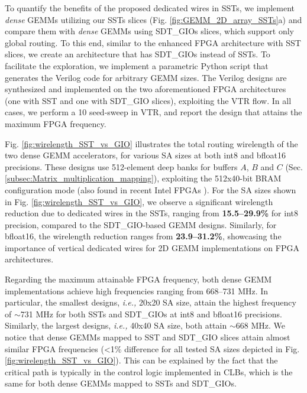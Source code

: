 To quantify the benefits of the proposed dedicated wires in SSTs, we implement \textit{dense} GEMMs utilizing our SSTs slices (Fig. \ref{fig:GEMM_2D_array_SSTs}a) and compare them with \textit{dense} GEMMs using SDT\_GIOs slices, which support only global routing.
To this end, similar to the enhanced FPGA architecture with SST slices, we create an architecture that has SDT\_GIOs instead of SSTs. 
To facilitate the exploration, we implement a parametric Python script that generates the Verilog code for arbitrary GEMM sizes.
The Verilog designs are synthesized and implemented on the two aforementioned FPGA architectures (one with SST and one with SDT\_GIO slices), exploiting the VTR flow.
In all cases, we perform a 10 seed-sweep in VTR, and report the design that attains the maximum FPGA frequency.




Fig. \ref{fig:wirelength_SST_vs_GIO} illustrates the total routing wirelength of the two dense GEMM accelerators, for various SA sizes at both int8 and bfloat16 precisions.
These designs use 512-element deep banks for buffers $A$, $B$ and $C$ (Sec. \ref{subsec:Matrix_multiplication_mapping}), exploiting the 512x40-bit BRAM configuration mode (also found in recent Intel FPGAs \cite{Intel_Agilex_5_M20Ks, Intel_Agilex_7_M20Ks, Intel_Stratix_10_M20Ks}).
For the SA sizes shown in Fig. \ref{fig:wirelength_SST_vs_GIO}, we observe a significant wirelength reduction due to dedicated wires in the SSTs, ranging from \textbf{15.5--29.9\%} for int8 precision, compared to the SDT\_GIO-based GEMM designs.
Similarly, for bfloat16, the wirelength reduction ranges from \textbf{23.9--31.2\%}, showcasing the importance of vertical dedicated wires for 2D GEMM implementations on FPGA architectures.


Regarding the maximum attainable FPGA frequency, both dense GEMM implementations 
achieve high frequencies ranging from 668--731 MHz.
In particular, the smallest designs, \emph{i.e.,} 20x20 SA size, attain the highest frequency of $\sim$731 MHz for both SSTs and SDT\_GIOs at int8 and bfloat16 precisions.
Similarly, the largest designs, \emph{i.e.,} 40x40 SA size, 
both attain $\sim$668 MHz. 
We notice that dense GEMMs mapped to SST and SDT\_GIO slices attain almost similar FPGA frequencies (<1\% difference for all tested SA sizes depicted in Fig. \ref{fig:wirelength_SST_vs_GIO}).
This can be explained by the fact that the critical path is typically in the control logic implemented in CLBs, which is the same for both dense GEMMs mapped to SSTs and SDT\_GIOs. 

